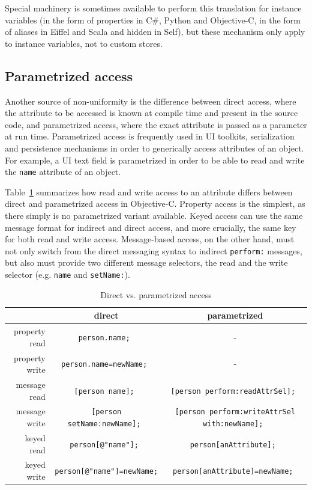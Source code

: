 \documentclass[preprint]{sigplanconf}
\begin{document}
  Special 
machinery is sometimes available to perform this translation for instance variables (in the form of 
properties in C\#, Python and Objective-C, in the form of aliases in Eiffel and Scala and hidden
in Self), but these mechanism only apply to instance variables, not to custom stores.



\subsection{Parametrized access}
\label{parametrized}
Another source of non-uniformity is the difference between direct access, where the attribute
to be accessed is known at compile time and present in the source code, and parametrized
access, where the exact attribute is passed as a parameter at run time.  Parametrized access
is frequently used in UI toolkits, serialization and persistence mechanisms in order to generically
access attributes of an object.  For example, a
UI text field is parametrized in order to be able to read and write the {\tt name} attribute of
an object.

Table~\ref{direct-vs-parametrized}
summarizes how read and write access to an attribute differs between direct and parametrized
access in Objective-C.  Property access is the simplest, as there simply is no parametrized variant
available.  Keyed access can use the same message format for indirect and direct access, and
more crucially, the same key for both read and write access.  Message-based access, on the
other hand, must not only switch from the direct messaging syntax to indirect {\tt perform:}
messages, but also must provide two different message selectors, the read and the write
selector (e.g. {\tt name} and {\tt setName:}).

\begin{table}[htbp]
\center
\begin{tabular}{|r|c|c|} \hline
   &  direct	 & parametrized  		 \\\hline 
property read 	 &   {\tt person.name;  }	&  -	 \\\hline 
property write 	 & {\tt person.name=newName; }	 & -		 \\\hline 
message read 	 &  {\tt  [person name]; }	 & {\tt [person perform:readAttrSel]; }		 \\\hline 
message write 	 & {\tt  [person setName:newName]; }	 & {\tt [person perform:writeAttrSel with:newName]; }		 \\\hline 
keyed read  & {\tt person[@"name"]; }	 & {\tt person[anAttribute];  }  \\\hline 
keyed write  & {\tt person[@"name"]=newName;}	 & {\tt person[anAttribute]=newName; }		 \\\hline 
\end{tabular}
\caption{Direct vs. parametrized access}
\label{direct-vs-parametrized}
\end{table}
\end{document}
